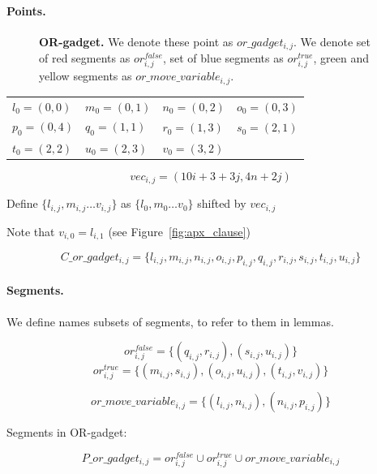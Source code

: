 \paragraph{Points.}

\begin{figure}[h]
\centering
\def\svgwidth{0.5\columnwidth}

\caption{
\textbf{OR-gadget.} We denote these point as $or\_gadget_{i, j}$. 
We denote set of red segments as $or^{false}_{i, j}$,
set of blue segments as $or^{true}_{i, j}$,
green and yellow segments as $or\_move\_variable_{i, j}$.
}
\label{fig:apx_or_gadget}
\end{figure}

	\begin{center}
\begin{tabular}{ l l l l}

	$l_0 = (0, 0)$ &
	$m_0 = (0, 1)$ &
	$n_0 = (0, 2)$ &
	$o_0 = (0, 3)$ \\
	$p_0 = (0, 4)$ &
	$q_0 = (1, 1)$ &
	$r_0 = (1, 3)$ &
	$s_0 = (2, 1)$ \\
	$t_0 = (2, 2)$ &
	$u_0 = (2, 3)$ &
	$v_0 = (3, 2)$ &
\end{tabular}
\end{center}


	$$vec_{i, j} = (10i + 3 + 3j, 4n + 2j)$$
	
	Define 
	$\{ l_{i, j}, m_{i, j} \ldots v_{i, j} \}$
	as $\{l_0, m_0 \ldots v_0\}$ shifted by $vec_{i, j}$

Note that $v_{i, 0} = l_{i, 1}$ (see Figure~\ref{fig:apx_clause})
 
  $$C\_or\_gadget_{i, j} = 
 \{l_{i, j}, m_{i, j}, n_{i, j}, o_{i, j},
 p_{i, j}, q_{i, j}, r_{i, j}, s_{i, j}, t_{i, j}, u_{i, j} \}
 $$
 
\paragraph{Segments.}

We define names subsets of segments, to refer to them in lemmas.
 
$$or^{false}_{i, j} =
\{ (q_{i, j}, r_{i, j}), (s_{i, j}, u_{i, j})\}$$
$$or^{true}_{i, j} =
\{ (m_{i, j}, s_{i, j}), (o_{i, j}, u_{i, j}),
(t_{i, j}, v_{i, j}) \}$$

$$or\_move\_variable_{i, j} =
\{ (l_{i, j}, n_{i, j}), (n_{i, j}, p_{i, j})\}$$

Segments in OR-gadget:

$$P\_or\_gadget_{i, j} = 
  or^{false}_{i, j} \cup or^{true}_{i, j} \cup or\_move\_variable_{i, j}
  $$


